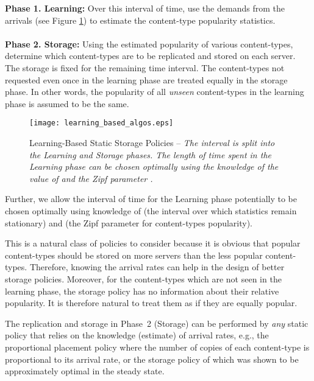 \documentclass[10pt, conference, letterpaper]{IEEEtran}
\begin{document}
\noindent \textbf{Phase 1. Learning:} Over this interval of time, use
the demands from the arrivals (see Figure
\ref{fig:learning_based_storage}) to estimate
the content-type popularity statistics. \\\\
\noindent \textbf{Phase 2. Storage:} Using the estimated popularity of
various content-types, determine which content-types are to be replicated
and stored on each server. The storage is fixed for the remaining time
interval. The content-types not requested even once in the learning
phase are treated equally in the storage phase. In other words, the
popularity of all {\em unseen} content-types in the learning phase is
assumed to be the same.\\

\begin{figure}[h]
	\begin{center}
		\texttt{[image: learning\_based\_algos.eps]}
		\caption{Learning-Based Static Storage Policies -- \sl The interval
			 is split into the Learning and Storage phases. The length of time spent in the Learning phase can be chosen optimally using the knowledge of the value of  and the Zipf parameter . \label{fig:learning_based_storage}}
	\end{center}
\end{figure}

Further, we allow the interval of time for the Learning phase potentially
to be chosen optimally using knowledge of  (the interval over
which statistics remain stationary) and  (the Zipf parameter
for content-types popularity).


This is a natural class of policies to consider because it is obvious
that popular content-types should be stored on more servers than the
less popular content-types. Therefore, knowing the arrival rates can
help in the design of better storage policies. Moreover, for the
content-types which are not seen in the learning phase, the storage
policy has no information about their relative popularity. It is
therefore natural to treat them as if they are equally popular.

The replication and storage in Phase~2 (Storage) can be performed by
\textit{any} static policy that relies on the knowledge (estimate) of
arrival rates, e.g., the proportional placement policy \cite{LLM12}
where the number of copies of each content-type is proportional
to its arrival rate, or the storage policy of \cite{LLM13} which was
shown to be approximately optimal in the steady state.
\end{document}
